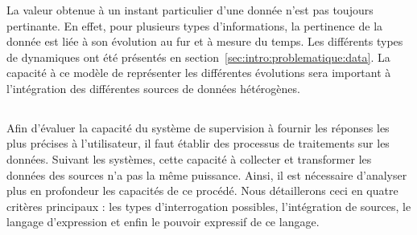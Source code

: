 \subsubsection{\critereAC}
La valeur obtenue à un instant particulier d'une donnée n'est pas toujours pertinante. En effet, pour plusieurs types d'informations, la pertinence de la donnée est liée à son évolution au fur et à mesure du temps. Les différents types de dynamiques ont été présentés en section~\ref{sec:intro:problematique:data}. La capacité à ce modèle de représenter les différentes évolutions sera important à l'intégration des différentes sources de données hétérogènes.

\subsection{\critereB}\label{sec:rw:supervision:criteres:traitement}
Afin d'évaluer la capacité du système de supervision à fournir les réponses les plus précises à l'utilisateur, il faut établir des processus de traitements sur les données. Suivant les systèmes, cette capacité à collecter et transformer les données des sources n'a pas la même puissance. Ainsi, il est nécessaire d'analyser plus en profondeur les capacités de ce procédé. Nous détaillerons ceci en quatre critères principaux : les types d'interrogation possibles, l'intégration de sources, le langage d'expression et enfin le pouvoir expressif de ce langage.

